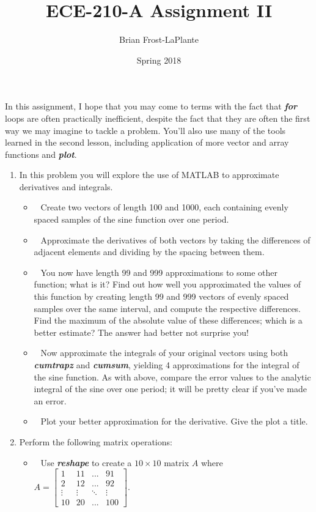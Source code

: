 \documentclass{article}
\title{ECE-210-A Assignment II}
\author{Brian Frost-LaPlante}
\date{Spring 2018}
\begin{document}
\maketitle
\noindent In this assignment, I hope that you may come to terms with the fact that \textit{\textbf{for}} loops are often practically inefficient, despite the fact that they are often the first way we may imagine to tackle a problem. You'll also use many of the tools learned in the second lesson, including application of more vector and array functions and \textit{\textbf{plot}}.
\begin{enumerate}[leftmargin=0cm,itemindent=.5cm,labelwidth=\itemindent,labelsep=0cm,align=left,label=\textbf{\arabic*.}]
\item In this problem you will explore the use of MATLAB to approximate derivatives and integrals.
	\begin{itemize}
		\item $\:\:$ Create two vectors of length 100 and 1000, each containing evenly spaced samples of the sine function over one period.
		\item $\:\:$ Approximate the derivatives of both vectors by taking the differences of adjacent elements and dividing by the spacing between them. 
		\item $\:\:$ You now have length 99 and 999 approximations to some other function; what is it? Find out how well you approximated the values of this function by creating length 99 and 999 vectors of evenly spaced samples over the same interval, and compute the respective differences. Find the maximum of the absolute value of these differences; which is a better estimate? The answer had better not surprise you!
		\item $\:\:$ Now approximate the integrals of your original vectors using both \textit{\textbf{cumtrapz}} and \textit{\textbf{cumsum}}, yielding 4 approximations for the integral of the sine function. As with above, compare the error values to the analytic integral of the sine over one period; it will be pretty clear if you've made an error. 
		\item $\:\:$ Plot your better approximation for the derivative. Give the plot a title.
	\end{itemize}
\item Perform the following matrix operations:
	\begin{itemize}
		\item $\:\:$ Use \textit{\textbf{reshape}} to create a $10 \times 10$ matrix $A$ where $A = \begin{bmatrix}1 &11 & ...& 91\\ 2&12&...&92\\ \vdots&\vdots&\ddots&\vdots\\ 10&20&...&100\end{bmatrix}$.

\end{itemize}
\end{enumerate}
\end{document}
